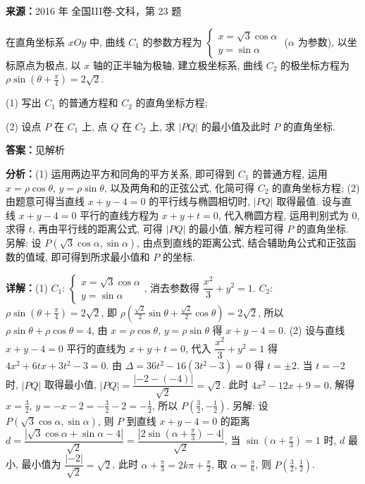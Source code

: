 \begin{question}[points=10]
\textbf{来源：}2016 年 全国III卷-文科，第 23 题\par
在直角坐标系 $xOy$ 中, 曲线 $C_1$ 的参数方程为 $\begin{cases}x=\sqrt{3}\cos\alpha\\ y=\sin\alpha\end{cases}$ ($\alpha$ 为参数), 以坐标原点为极点, 以 $x$ 轴的正半轴为极轴, 建立极坐标系, 曲线 $C_2$ 的极坐标方程为 $\rho\sin(\theta+\frac{\pi}{4})=2\sqrt{2}$.

(1) 写出 $C_1$ 的普通方程和 $C_2$ 的直角坐标方程;

(2) 设点 $P$ 在 $C_1$ 上, 点 $Q$ 在 $C_2$ 上, 求 $|PQ|$ 的最小值及此时 $P$ 的直角坐标.
\begin{solution}
\textbf{答案：}见解析

\textbf{分析：}(1) 运用两边平方和同角的平方关系, 即可得到 $C_1$ 的普通方程, 运用 $x=\rho\cos\theta$, $y=\rho\sin\theta$, 以及两角和的正弦公式, 化简可得 $C_2$ 的直角坐标方程;
(2) 由题意可得当直线 $x+y-4=0$ 的平行线与椭圆相切时, $|PQ|$ 取得最值. 设与直线 $x+y-4=0$ 平行的直线方程为 $x+y+t=0$, 代入椭圆方程, 运用判别式为 $0$, 求得 $t$, 再由平行线的距离公式, 可得 $|PQ|$ 的最小值, 解方程可得 $P$ 的直角坐标. 另解: 设 $P(\sqrt{3}\cos\alpha,\sin\alpha)$, 由点到直线的距离公式, 结合辅助角公式和正弦函数的值域, 即可得到所求最小值和 $P$ 的坐标.

\textbf{详解：}(1) $C_1$: $\begin{cases}x=\sqrt{3}\cos\alpha\\ y=\sin\alpha\end{cases}$, 消去参数得 $\dfrac{x^2}{3}+y^2=1$. $C_2$: $\rho\sin(\theta+\frac{\pi}{4})=2\sqrt{2}$, 即 $\rho(\frac{\sqrt{2}}{2}\sin\theta+\frac{\sqrt{2}}{2}\cos\theta)=2\sqrt{2}$, 所以 $\rho\sin\theta+\rho\cos\theta=4$, 由 $x=\rho\cos\theta$, $y=\rho\sin\theta$ 得 $x+y-4=0$.
(2) 设与直线 $x+y-4=0$ 平行的直线为 $x+y+t=0$, 代入 $\dfrac{x^2}{3}+y^2=1$ 得 $4x^2+6tx+3t^2-3=0$. 由 $\Delta=36t^2-16(3t^2-3)=0$ 得 $t=\pm2$. 当 $t=-2$ 时, $|PQ|$ 取得最小值, $|PQ|=\dfrac{|-2-(-4)|}{\sqrt{2}}=\sqrt{2}$. 此时 $4x^2-12x+9=0$, 解得 $x=\frac{3}{2}$, $y=-x-2=-\frac{3}{2}-2=-\frac{1}{2}$, 所以 $P(\frac{3}{2},-\frac{1}{2})$.
另解: 设 $P(\sqrt{3}\cos\alpha,\sin\alpha)$, 则 $P$ 到直线 $x+y-4=0$ 的距离 $d=\dfrac{|\sqrt{3}\cos\alpha+\sin\alpha-4|}{\sqrt{2}}=\dfrac{|2\sin(\alpha+\frac{\pi}{3})-4|}{\sqrt{2}}$, 当 $\sin(\alpha+\frac{\pi}{3})=1$ 时, $d$ 最小, 最小值为 $\dfrac{|-2|}{\sqrt{2}}=\sqrt{2}$, 此时 $\alpha+\frac{\pi}{3}=2k\pi+\frac{\pi}{2}$, 取 $\alpha=\frac{\pi}{6}$, 则 $P(\frac{3}{2},\frac{1}{2})$.
\end{solution}
\end{question}


